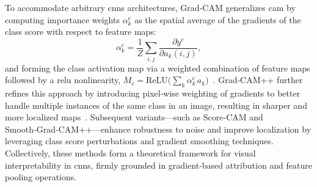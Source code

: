 To accommodate arbitrary \acp{cnn} architectures, Grad‑CAM generalizes \ac{cam} by computing importance weights \(\alpha_k^c\) as the spatial average of the gradients of the class score with respect to feature maps:
\[
\alpha_k^c = \frac{1}{Z}\sum_{i,j}\frac{\partial y^c}{\partial a_k(i,j)},
\] and forming the class activation map via a weighted combination of feature maps followed by a \ac{relu} nonlinearity, \(M_c = \mathrm{ReLU}\bigl(\sum_k \alpha_k^c\,a_k\bigr)\)~\cite{selvaraju_grad-cam_2017}. Grad‑CAM++ further refines this approach by introducing pixel‑wise weighting of gradients to better handle multiple instances of the same class in an image, resulting in sharper and more localized maps~\cite{chattopadhay_grad-cam_2018}. Subsequent variants—such as Score‑CAM and Smooth‑Grad‑CAM++—enhance robustness to noise and improve localization by leveraging class score perturbations and gradient smoothing techniques. Collectively, these methods form a theoretical framework for visual interpretability in \acp{cnn}, firmly grounded in gradient‐based attribution and feature pooling operations.